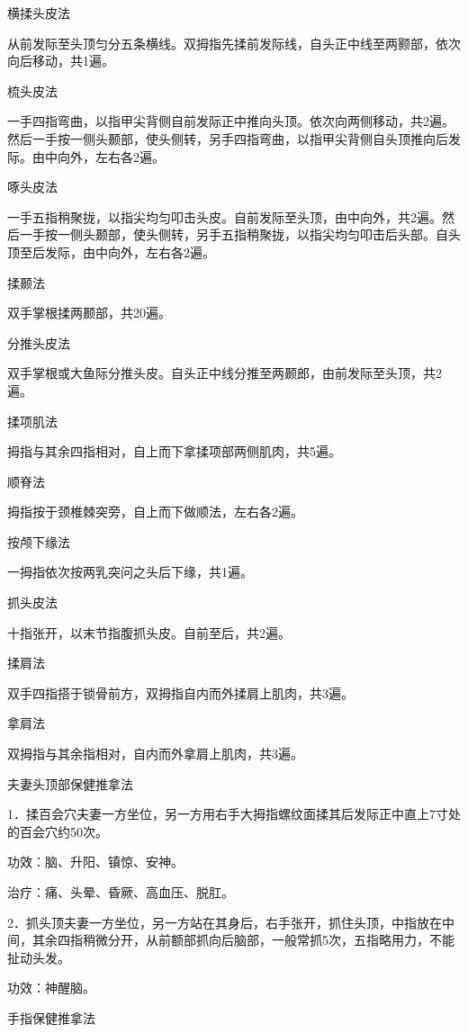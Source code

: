 \documentclass[12pt,UTF8]{ctexbook}
\begin{document}
横揉头皮法

从前发际至头顶匀分五条横线。双拇指先揉前发际线，自头正中线至两颢部，依次向后移动，共1遍。

梳头皮法

一手四指弯曲，以指甲尖背侧自前发际正中推向头顶。依次向两侧移动，共2遍。然后一手按一侧头颞部，使头侧转，另手四指弯曲，以指甲尖背侧自头顶推向后发际。由中向外，左右各2遍。

啄头皮法

一手五指稍聚拢，以指尖均匀叩击头皮。自前发际至头顶，由中向外，共2遍。然后一手按一侧头颞部，使头侧转，另手五指稍聚拢，以指尖均匀叩击后头部。自头顶至后发际，由中向外，左右各2遍。

揉颞法

双手掌根揉两颞部，共20遍。

分推头皮法

双手掌根或大鱼际分推头皮。自头正中线分推至两颞郎，由前发际至头顶，共2遍。

揉项肌法

拇指与其余四指相对，自上而下拿揉项部两侧肌肉，共5遍。

顺脊法

拇指按于颈椎棘突旁，自上而下做顺法，左右各2遍。

按颅下缘法

一拇指依次按两乳突问之头后下缘，共1遍。

抓头皮法

十指张开，以末节指腹抓头皮。自前至后，共2遍。

揉肩法

双手四指搭于锁骨前方，双拇指自内而外揉肩上肌肉，共3遍。

拿肩法

双拇指与其余指相对，自内而外拿肩上肌肉，共3遍。





夫妻头顶部保健推拿法


1．揉百会穴夫妻一方坐位，另一方用右手大拇指螺纹面揉其后发际正中直上7寸处的百会穴约50次。

功效：脑、升阳、镇惊、安神。

治疗：痛、头晕、昏厥、高血压、脱肛。

2．抓头顶夫妻一方坐位，另一方站在其身后，右手张开，抓住头顶，中指放在中间，其余四指稍微分开，从前额部抓向后脑部，一般常抓5次，五指略用力，不能扯动头发。

功效：神醒脑。





手指保健推拿法
\end{document}
